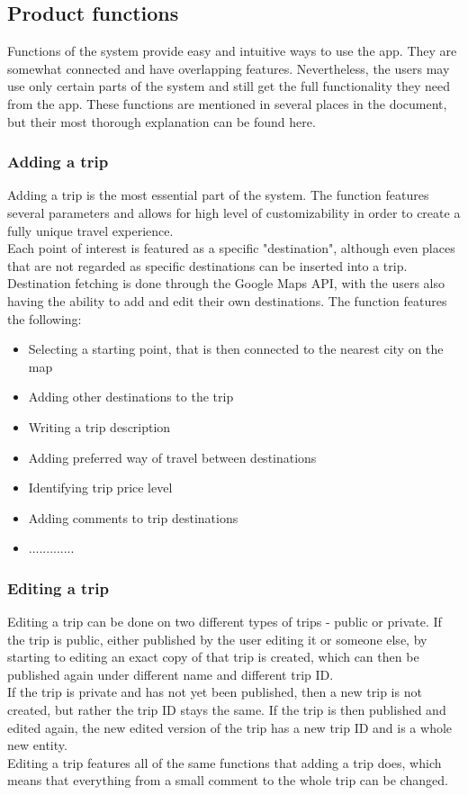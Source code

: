 \subsection{Product functions}
\hspace{\parindent}Functions of the system provide easy and intuitive ways to use the app. They are somewhat connected and have overlapping features. Nevertheless, the users may use only certain parts of the system and still get the full functionality they need from the app.
These functions are mentioned in several places in the document, but their most thorough explanation can be found here.
\subsubsection{Adding a trip}
\hspace{\parindent}Adding a trip is the most essential part of the system. The function features several parameters and allows for high level of customizability in order to create a fully unique travel experience. \\
Each point of interest is featured as a specific "destination", although even places that are not regarded as specific destinations can be inserted into a trip. Destination fetching is done through the Google Maps API, with the users also having the ability to add and edit their own destinations.
The function features the following:
\begin{itemize}
\item Selecting a starting point, that is then connected to the nearest city on the map
\item Adding other destinations to the trip
\item Writing a trip description
\item Adding preferred way of travel between destinations
\item Identifying trip price level
\item Adding comments to trip destinations
\item .............
\end{itemize}
\subsubsection{Editing a trip}
\hspace{\parindent}Editing a trip can be done on two different types of trips - public or private. If the trip is public, either published by the user editing it or someone else, by starting to editing an exact copy of that trip is created, which can then be published again under different name and different trip ID.\\
If the trip is private and has not yet been published, then a new trip is not created, but rather the trip ID stays the same. If the trip is then published and edited again, the new edited version of the trip has a new trip ID and is a whole new entity.\\
Editing a trip features all of the same functions that adding a trip does, which means that everything from a small comment to the whole trip can be changed. 
